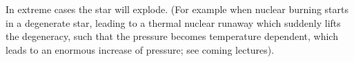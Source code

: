 \documentclass[11pt,a4paper]{report}
\begin{document}
\begin{enumerate}
\begin{enumerate}
    In extreme cases the star will explode. (For example when nuclear
    burning starts in a degenerate star, leading to a thermal nuclear
    runaway which suddenly lifts the degeneracy, such that the
    pressure becomes temperature dependent, which leads to an enormous
    increase of pressure; see coming lectures).




  \end{enumerate}


\end{enumerate}
\end{document}
